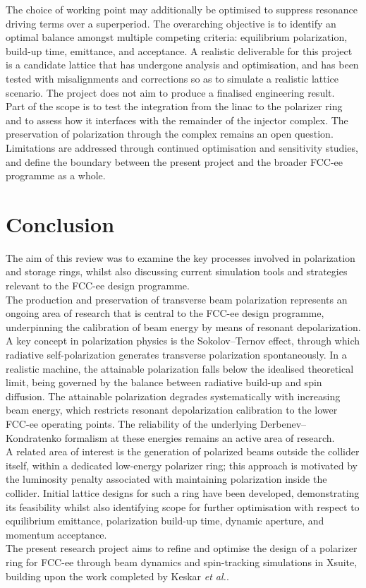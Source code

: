 \documentclass[%
 aip,
 amsmath,amssymb,
 reprint,%
superscriptaddress
]{revtex4-2}
\begin{document}
The choice of working point may additionally be optimised to suppress resonance driving terms over a superperiod\cite{verdier1999}.
The overarching objective is to identify an optimal balance amongst multiple competing criteria: equilibrium polarization, build-up time, emittance, and acceptance.
A realistic deliverable for this project is a candidate lattice that has undergone analysis and optimisation, and has been tested with misalignments and corrections so as to simulate a realistic lattice scenario.
The project does not aim to produce a finalised engineering result.
\\
Part of the scope is to test the integration from the linac to the polarizer ring and to assess how it interfaces with the remainder of the injector complex.
The preservation of polarization through the complex remains an open question\cite{keintzel:ipac2026-mop1037}.
Limitations are addressed through continued optimisation and sensitivity studies, and define the boundary between the present project and the broader FCC-ee programme as a whole.

\section{Conclusion}

The aim of this review was to examine the key processes involved in polarization and storage rings, whilst also discussing current simulation tools and strategies relevant to the FCC-ee design programme.
\\
The production and preservation of transverse beam polarization represents an ongoing area of research that is central to the FCC-ee design programme, underpinning the calibration of beam energy by means of resonant depolarization.
\\
A key concept in polarization physics is the Sokolov–Ternov effect, through which radiative self-polarization generates transverse polarization spontaneously.
In a realistic machine, the attainable polarization falls below the idealised theoretical limit, being governed by the balance between radiative build-up and spin diffusion.
The attainable polarization degrades systematically with increasing beam energy, which restricts resonant depolarization calibration to the lower FCC-ee operating points.
The reliability of the underlying Derbenev–Kondratenko formalism at these energies remains an active area of research.
\\
A related area of interest is the generation of polarized beams outside the collider itself, within a dedicated low-energy polarizer ring; this approach is motivated by the luminosity penalty associated with maintaining polarization inside the collider.
Initial lattice designs for such a ring have been developed, demonstrating its feasibility whilst also identifying scope for further optimisation with respect to equilibrium emittance, polarization build-up time, dynamic aperture, and momentum acceptance.
\\
The present research project aims to refine and optimise the design of a polarizer ring for FCC-ee through beam dynamics and spin-tracking simulations in Xsuite, building upon the work completed by Keskar \textit{et al.}\cite{keskar_bartosik_carli_2026}.
\end{document}
